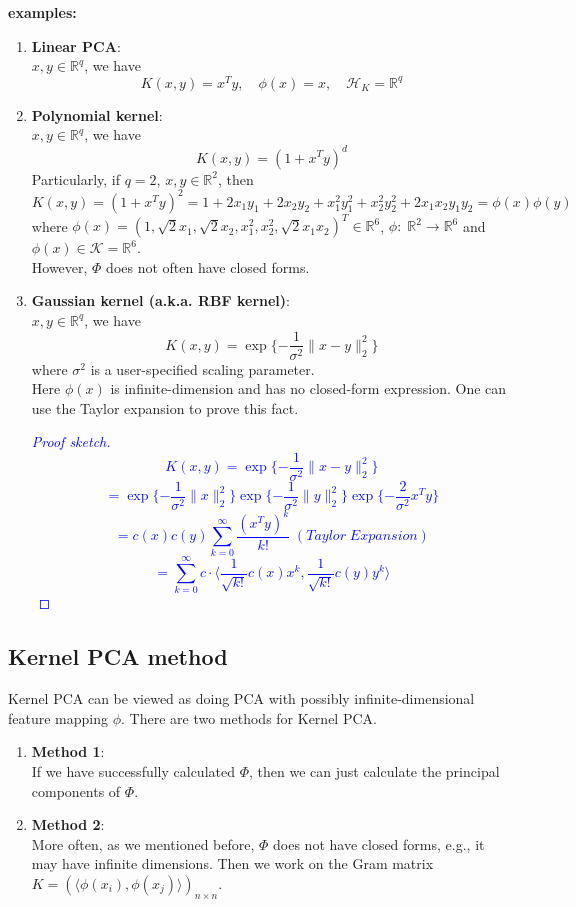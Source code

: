 \documentclass[12pt]{book}
\theoremstyle{definition}
\theoremstyle{remark}
\newcommand{\R}{\mathbb{R}}
\begin{document}
\textbf{examples:}
\begin{enumerate}
    \item \textbf{Linear PCA}:\\
    $x,y \in \R^q$, we have 
    \[K(x,y) = x^Ty,\quad \phi(x) = x, \quad \mathcal{H}_K = \R^q\]
    \item \textbf{Polynomial kernel}:\\
    $x,y \in \R^q$, we have
    \[K(x,y) = (1+x^Ty)^d\]
    Particularly, if $q = 2$, $x,y \in \R^2$, then
    \[K(x,y) = (1+x^Ty)^2 = 1+2x_1y_1+2x_2y_2+x_1^2y_1^2+x_2^2y_2^2+2x_1x_2y_1y_2 = \phi(x)\phi(y)\]
    where $\phi(x) = (1, \sqrt{2}x_1, \sqrt{2}x_2, x_1^2,x_2^2, \sqrt{2}x_1x_2)^T \in \R^6$, $\phi:\;\R^2\rightarrow\R^6$ and $\phi(x)\in\mathcal{K} = \R^6$.\\
    However, $\Phi$ does not often have closed forms.
    \item \textbf{Gaussian kernel (a.k.a. RBF kernel)}:\\
    $x,y \in \R^q$, we have 
    \[K(x,y) = \exp\{-\frac{1}{\sigma^2}\|x-y\|_2^2\}\]
    where $\sigma^2$ is a user-specified scaling parameter.\\
    Here $\phi(x)$ is infinite-dimension and has no closed-form expression. One can use the Taylor expansion to prove this fact.
    \textcolor{blue}{
    \begin{proof}[Proof sketch]
        \[K(x,y) = \exp\{-\frac{1}{\sigma^2}\|x-y\|_2^2\}\]
        \[ = \exp\{-\frac{1}{\sigma^2}\|x\|_2^2\}\exp\{-\frac{1}{\sigma^2}\|y\|_2^2\}\exp\{-\frac{2}{\sigma^2}x^Ty\}\]
        \[= c(x)c(y)\sum_{k=0}^{\infty}\frac{(x^Ty)^k}{k!}\; (Taylor\;Expansion)\]
        \[ = \sum_{k=0}^{\infty}c\cdot\langle \frac{1}{\sqrt{k!}} c(x)x^k,\frac{1}{\sqrt{k!}} c(y)y^k\rangle\]
    \end{proof}
    }
\end{enumerate}

\subsection{Kernel PCA method}
Kernel PCA can be viewed as doing PCA with possibly infinite-dimensional feature mapping $\phi$.
There are two methods for Kernel PCA.
\begin{enumerate}
    \item \textbf{Method 1}:\\
    If we have successfully calculated $\Phi$, then we can just calculate the principal components of $\Phi$. 
    \item \textbf{Method 2}:\\
    More often, as we mentioned before, $\Phi$ does not have closed forms, e.g., it may have infinite dimensions. Then we work on the Gram matrix $K = (\langle \phi(x_i),\phi(x_j)\rangle)_{n\times n}$.
\end{enumerate}
\end{document}
